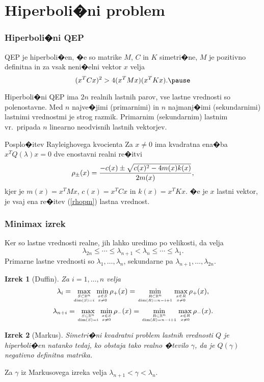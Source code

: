 \documentclass[9pt]{beamer}
\newtheorem{izrek}{Izrek}
\def\RR{{\mathbb R}}
\begin{document}
\section{Hiperboli�ni problem}
\begin{frame}
\frametitle{Hiperboli�ni QEP}

QEP je \alert{hiperboli�en},  �e so matrike $M$, $C$ in $K$ simetri�ne,
$M$ je pozitivno definitna in za vsak neni�elni vektor $x$ velja
$$
(x^TCx)^2>4(x^TMx)(x^TKx).\pause
$$

Hiperboli�ni QEP ima $2n$ realnih
lastnih parov, vse lastne vrednosti so
polenostavne. Med $n$ najve�jimi
(\alert{primarnimi}) in $n$ najmanj�imi
(\alert{sekundarnimi}) lastnimi vrednostmi je \alert{strog razmik}.
Primarnim (sekundarnim) lastnim vr.~pripada $n$ linearno neodvisnih lastnih
vektorjev.\pause

\begin{block}{Posplo�itev Rayleighovega kvocienta}
Za  $x\ne 0$ ima kvadratna ena�ba $x^TQ(\lambda)x=0$
dve enostavni realni re�itvi
\begin{equation}
  \rho_{\pm}(x)={-c(x)\pm\sqrt{c(x)^2-4m(x)k(x)}\over 2 m(x)},
  \label{rhopm}
\end{equation}
kjer je $m(x)=x^TMx$, $c(x)=x^TCx$ in $k(x)=x^TKx$.
�e je $x$ lastni vektor, je vsaj ena
re�itev (\ref{rhopm}) lastna vrednost.
\end{block}\vspace{0.5em}


\end{frame}
\begin{frame}
\frametitle{Minimax izrek}

Ker so lastne vrednosti realne, jih lahko uredimo po velikosti, da velja
$$\lambda_{2n}\le \cdots\le \lambda_{n+1}
  <\lambda_n\le \cdots \le \lambda_1.$$
Primarne lastne vrednosti so $\lambda_1,\ldots,\lambda_n$,
sekundarne pa $\lambda_{n+1},\ldots,\lambda_{2n}$.

\begin{izrek}[Duffin] Za $i=1,\ldots,n$ velja
  $$\lambda_i=\max_{S\subset\RR^n\atop \dim(S)=i}
              \min_{x\in S\atop x\ne 0}\rho_{+}(x)
             =\min_{R\subset\RR^n\atop \dim(R)=n-i+1}
              \max_{x\in R\atop x\ne 0}\rho_{+}(x),$$
  $$\lambda_{n+i}=\max_{S\subset\RR^n\atop \dim(S)=i}
                  \min_{x\in S\atop x\ne 0}\rho_{-}(x)
                 =\min_{R\subset\RR^n\atop \dim(R)=n-i+1}
                  \max_{x\in R\atop x\ne 0}\rho_{-}(x).$$
  \label{minimax}
\end{izrek}

\begin{izrek}[Markus]
  Simetri�ni kvadratni problem lastnih vrednosti $Q$ je
  hiperboli�en natanko tedaj, ko obstaja tako realno �tevilo $\gamma$,
  da je $Q(\gamma)$ negativno definitna matrika.
  \label{thmmarkus}
\end{izrek}

Za $\gamma$ iz Markusovega izreka velja $\lambda_{n+1}<\gamma<\lambda_{n}$.
\end{frame}
\end{document}
